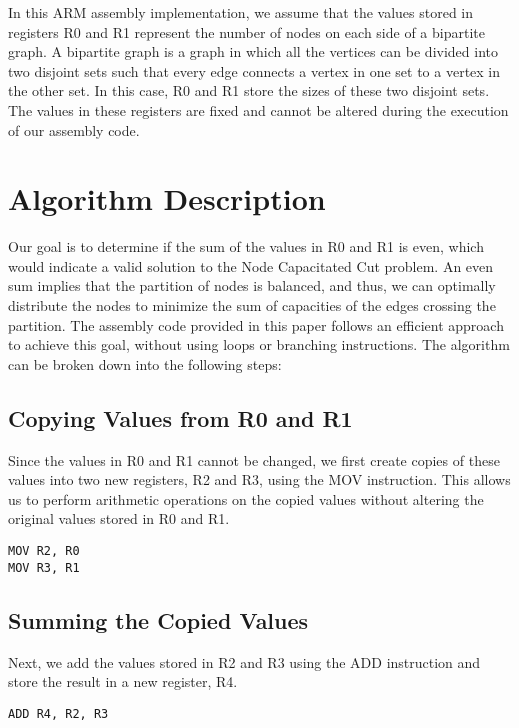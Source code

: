 In this ARM assembly implementation, we assume that the values stored in registers R0 and R1 represent the number of nodes on each side of a bipartite graph. A bipartite graph is a graph in which all the vertices can be divided into two disjoint sets such that every edge connects a vertex in one set to a vertex in the other set. In this case, R0 and R1 store the sizes of these two disjoint sets. The values in these registers are fixed and cannot be altered during the execution of our assembly code.

\section{Algorithm Description}

Our goal is to determine if the sum of the values in R0 and R1 is even, which would indicate a valid solution to the Node Capacitated Cut problem. An even sum implies that the partition of nodes is balanced, and thus, we can optimally distribute the nodes to minimize the sum of capacities of the edges crossing the partition. The assembly code provided in this paper follows an efficient approach to achieve this goal, without using loops or branching instructions. The algorithm can be broken down into the following steps:

\subsection{Copying Values from R0 and R1}

Since the values in R0 and R1 cannot be changed, we first create copies of these values into two new registers, R2 and R3, using the MOV instruction. This allows us to perform arithmetic operations on the copied values without altering the original values stored in R0 and R1.

\begin{verbatim}
MOV R2, R0
MOV R3, R1
\end{verbatim}

\subsection{Summing the Copied Values}

Next, we add the values stored in R2 and R3 using the ADD instruction and store the result in a new register, R4.

\begin{verbatim}
ADD R4, R2, R3
\end{verbatim}

